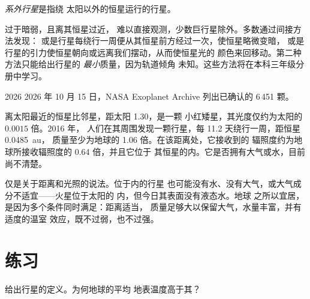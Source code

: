 \begin{definition}[系外行星]\label{def:g10:habitable-planet:exoplanet}
\emph{系外行星}是指绕
太阳以外的恒星运行的行星。
\end{definition}

过于暗弱，且离其恒星过近，
难以直接观测，少数巨行星除外。多数通过间接方法发现：
或是行星每绕行一周便从其恒星前方经过一次，使恒星略微变暗，
或是行星的引力使恒星朝向或远离我们摆动，从而使恒星光的
颜色来回移动。第二种方法只能给出行星的
\emph{最小}质量，因为轨道倾角
未知。这些方法将在本科三年级分册中学习。

\begin{dated}{2026}
2026 年 10 月 15 日，NASA Exoplanet Archive 列出已确认的 6\,451
颗。
\end{dated}

\begin{example}[比邻星 b]\label{ex:g10:habitable-planet:proxima}
离太阳最近的恒星比邻星，距太阳 \qty{1.30}{\parsec}，是一颗
小红矮星，其光度仅约为太阳的 $0.0015$ 倍。2016 年，
人们在其周围发现一颗行星，每 11.2 天绕行一周，距恒星 \qty{0.0485}{au}，
质量至少为地球的 1.06 倍。在该距离处，它接收到的
辐照度约为地球所接收辐照度的 0.64 倍，并且它位于
其恒星的内。它是否拥有大气或水，目前尚不清楚。
\end{example}

\begin{remark}[宜居不等于有生命]\label{rem:g10:habitable-planet:inhabited}
仅是关于距离和光照的说法。位于内的行星
也可能没有水、没有大气，或大气成分不适宜——火星位于太阳的
内，但今日其表面没有液态水。地球
之所以宜居，是因为多个条件同时满足：距离适当，
质量足够大以保留大气，水量丰富，并有适度的温室
效应，既不过弱，也不过强。
\end{remark}

\section{练习}

\begin{exercise}[$\star$]\label{exo:g10:habitable-planet:1}
给出行星的定义。为何地球的平均
地表温度高于其？
\end{exercise}

